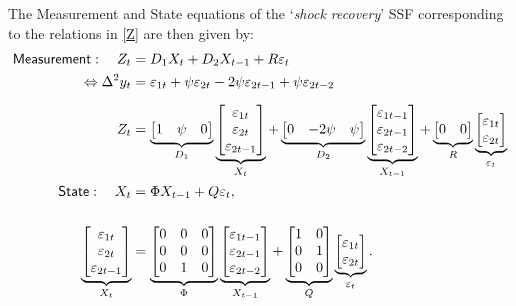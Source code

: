 \documentclass[a4paper,final,12pt]{article}
\newcommand{\bsq}{\begin{subequations}}\newcommand{\esq}{\end{subequations}}
\begin{document}
The Measurement and State equations of the `\emph{shock recovery}' SSF
corresponding to the relations in \ref{Z} are then given by:\bsq\label{K0SSM}%
\begin{align}
\mathsf{Measurement}:\quad Z_{t}& =D_{1}X_{t}+D_{2}X_{t-1}+R\varepsilon _{t}
\notag \\
\Leftrightarrow \Delta ^{2}y_{t}& =\varepsilon _{1t}+\psi \varepsilon
_{2t}-2\psi \varepsilon _{2t-1}+\psi \varepsilon _{2t-2} \\[2mm]
Z_{t}& =\underbrace{%
\begin{bmatrix}
1 & \psi  & 0%
\end{bmatrix}%
}_{D_{1}}\underbrace{%
\begin{bmatrix}
\varepsilon _{1t} \\ 
\varepsilon _{2t} \\ 
\varepsilon _{2t-1}%
\end{bmatrix}%
}_{X_{t}}+\underbrace{%
\begin{bmatrix}
0 & -2\psi  & \psi 
\end{bmatrix}%
}_{D_{2}}\underbrace{%
\begin{bmatrix}
\varepsilon _{1t-1} \\ 
\varepsilon _{2t-1} \\ 
\varepsilon _{2t-2}%
\end{bmatrix}%
}_{X_{t-1}}+\underbrace{%
\begin{bmatrix}
0 & 0%
\end{bmatrix}%
}_{R}\underbrace{%
\begin{bmatrix}
\varepsilon _{1t} \\ 
\varepsilon _{2t}%
\end{bmatrix}%
}_{\varepsilon _{t}} \\
\mathsf{State}:\quad X_{t}& =\Phi X_{t-1}+Q\varepsilon _{t},  \notag \\[5mm]
\underbrace{%
\begin{bmatrix}
\varepsilon _{1t} \\ 
\varepsilon _{2t} \\ 
\varepsilon _{2t-1}%
\end{bmatrix}%
}_{X_{t}}& =\underbrace{%
\begin{bmatrix}
0 & 0 & 0 \\ 
0 & 0 & 0 \\ 
0 & 1 & 0%
\end{bmatrix}%
}_{\Phi }\underbrace{%
\begin{bmatrix}
\varepsilon _{1t-1} \\ 
\varepsilon _{2t-1} \\ 
\varepsilon _{2t-2}%
\end{bmatrix}%
}_{X_{t-1}}+\underbrace{%
\begin{bmatrix}
1 & 0 \\ 
0 & 1 \\ 
0 & 0%
\end{bmatrix}%
}_{Q}\underbrace{%
\begin{bmatrix}
\varepsilon _{1t} \\ 
\varepsilon _{2t}%
\end{bmatrix}%
}_{\varepsilon _{t}}.
\end{align}%
\esq
\end{document}
